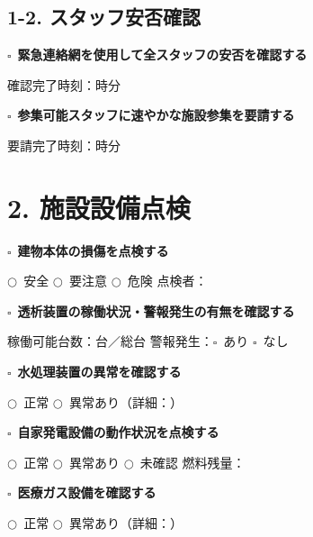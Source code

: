 \documentclass[a4paper,12pt]{jarticle}
\newcommand{\checkbox}{$\square$\ }
\newcommand{\underlinespace}[1]{\underline{\hspace{#1}}}
\newcommand{\circlecheck}{$\bigcirc$\ }
\begin{document}
\vspace{5mm}

\subsection*{1-2. スタッフ安否確認}

\checkbox \textbf{緊急連絡網を使用して全スタッフの安否を確認する}

\quad 確認完了時刻：\underlinespace{1cm}時\underlinespace{1cm}分

\vspace{3mm}

\checkbox \textbf{参集可能スタッフに速やかな施設参集を要請する}

\quad 要請完了時刻：\underlinespace{1cm}時\underlinespace{1cm}分

\vspace{5mm}

\section*{2. 施設設備点検}

\checkbox \textbf{建物本体の損傷を点検する}

\quad \circlecheck 安全 \quad \circlecheck 要注意 \quad \circlecheck 危険 \quad 点検者：\underlinespace{4cm}

\vspace{3mm}

\checkbox \textbf{透析装置の稼働状況・警報発生の有無を確認する}

\quad 稼働可能台数：\underlinespace{2cm}台／総\underlinespace{2cm}台 \quad 警報発生：\checkbox あり \checkbox なし

\vspace{3mm}

\checkbox \textbf{水処理装置の異常を確認する}

\quad \circlecheck 正常 \quad \circlecheck 異常あり（詳細：\underlinespace{6cm}）

\vspace{3mm}

\checkbox \textbf{自家発電設備の動作状況を点検する}

\quad \circlecheck 正常 \quad \circlecheck 異常あり \quad \circlecheck 未確認 \quad 燃料残量：\underlinespace{3cm}

\vspace{3mm}

\checkbox \textbf{医療ガス設備を確認する}

\quad \circlecheck 正常 \quad \circlecheck 異常あり（詳細：\underlinespace{6cm}）
\end{document}
